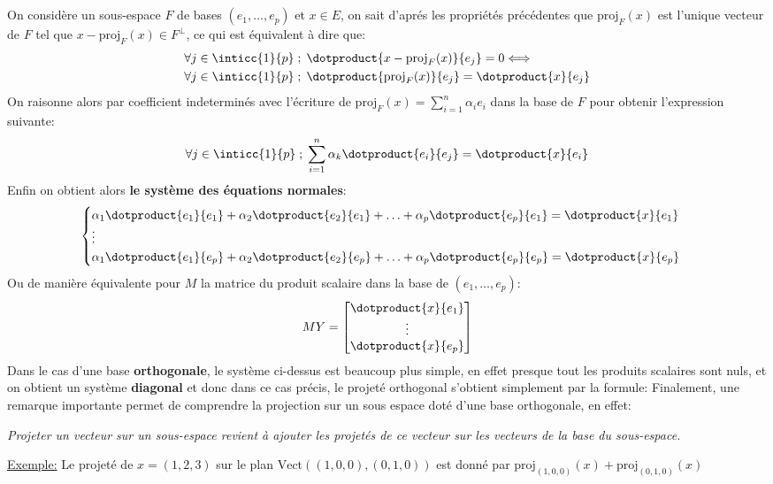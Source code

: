 \subsection*{}
On considère un sous-espace \(F\) de bases \((e_1, \ldots, e_p)\) et \(x \in E\), on sait d'aprés les propriétés précédentes que \(\text{proj}_F(x)\) est l'unique vecteur de \(F\) tel que \(x - \text{proj}_F(x) \in F^\perp\), ce qui est équivalent à dire que:
\begin{align*}
   &\forall j \in \inticc{1}{p} \; ; \; \dotproduct{x - \text{proj}_F(x)}{e_j} = 0 \Longleftrightarrow \\
   &\forall j \in \inticc{1}{p} \; ; \; \dotproduct{\text{proj}_F(x)}{e_j} = \dotproduct{x}{e_j}
\end{align*}
On raisonne alors par coefficient indeterminés avec l'écriture de \(\text{proj}_F(x) = \sum_{i=1}^{n} \alpha_i e_i\) dans la base de \(F\) pour obtenir l'expression suivante:
\[
   \forall j \in \inticc{1}{p} \; ; \; \sum_{i=1}^{n}\alpha_k \dotproduct{e_i}{e_j} = \dotproduct{x}{e_i}
\] 
Enfin on obtient alors \textbf{le système des équations normales}:
\[
   \begin{cases}
      \alpha_1 \dotproduct{e_1}{e_1} + \alpha_2 \dotproduct{e_2}{e_1} + \ldots + \alpha_p \dotproduct{e_p}{e_1} = \dotproduct{x}{e_1}\\
      \vdots \\
      \alpha_1 \dotproduct{e_1}{e_p} + \alpha_2 \dotproduct{e_2}{e_p} + \ldots + \alpha_p \dotproduct{e_p}{e_p} = \dotproduct{x}{e_p}
   \end{cases} 
\]
Ou de manière équivalente pour \(M\) la matrice du produit scalaire dans la base de \((e_1, \ldots, e_p)\):
\[
   MY = 
   \begin{bmatrix}
      \dotproduct{x}{e_1}\\
      \vdots \\
      \dotproduct{x}{e_p}
   \end{bmatrix}
\]
Dans le cas d'une base \textbf{orthogonale}, le système ci-dessus est beaucoup plus simple, en effet presque tout les produits scalaires sont nuls, et on obtient un système \textbf{diagonal} et donc dans ce cas précis, le projeté orthogonal s'obtient simplement par la formule:
Finalement, une remarque importante permet de comprendre la projection sur un sous espace doté d'une base orthogonale, en effet:
\begin{center}
   \textit{Projeter un vecteur sur un sous-espace revient à ajouter les projetés de ce vecteur sur les vecteurs de la base du sous-espace.}
\end{center}
\underline{Exemple:} Le projeté de \(x = (1, 2, 3)\) sur le plan \(\text{Vect}((1, 0, 0), (0, 1, 0))\) est donné par \(\text{proj}_{(1, 0, 0)}(x) + \text{proj}_{(0, 1, 0)}(x)\)
